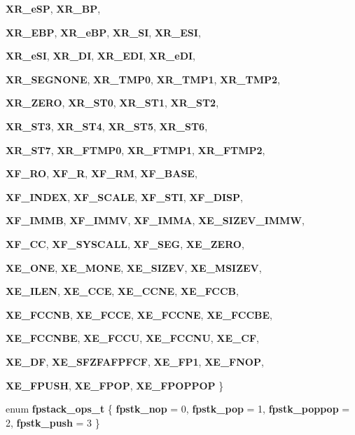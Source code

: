 \begin{CompactItemize}
{\bf XR\_\-eSP}, 
{\bf XR\_\-BP}, 
\par
{\bf XR\_\-EBP}, 
{\bf XR\_\-eBP}, 
{\bf XR\_\-SI}, 
{\bf XR\_\-ESI}, 
\par
{\bf XR\_\-eSI}, 
{\bf XR\_\-DI}, 
{\bf XR\_\-EDI}, 
{\bf XR\_\-eDI}, 
\par
{\bf XR\_\-SEGNONE}, 
{\bf XR\_\-TMP0}, 
{\bf XR\_\-TMP1}, 
{\bf XR\_\-TMP2}, 
\par
{\bf XR\_\-ZERO}, 
{\bf XR\_\-ST0}, 
{\bf XR\_\-ST1}, 
{\bf XR\_\-ST2}, 
\par
{\bf XR\_\-ST3}, 
{\bf XR\_\-ST4}, 
{\bf XR\_\-ST5}, 
{\bf XR\_\-ST6}, 
\par
{\bf XR\_\-ST7}, 
{\bf XR\_\-FTMP0}, 
{\bf XR\_\-FTMP1}, 
{\bf XR\_\-FTMP2}, 
\par
{\bf XF\_\-RO}, 
{\bf XF\_\-R}, 
{\bf XF\_\-RM}, 
{\bf XF\_\-BASE}, 
\par
{\bf XF\_\-INDEX}, 
{\bf XF\_\-SCALE}, 
{\bf XF\_\-STI}, 
{\bf XF\_\-DISP}, 
\par
{\bf XF\_\-IMMB}, 
{\bf XF\_\-IMMV}, 
{\bf XF\_\-IMMA}, 
{\bf XE\_\-SIZEV\_\-IMMW}, 
\par
{\bf XF\_\-CC}, 
{\bf XF\_\-SYSCALL}, 
{\bf XF\_\-SEG}, 
{\bf XE\_\-ZERO}, 
\par
{\bf XE\_\-ONE}, 
{\bf XE\_\-MONE}, 
{\bf XE\_\-SIZEV}, 
{\bf XE\_\-MSIZEV}, 
\par
{\bf XE\_\-ILEN}, 
{\bf XE\_\-CCE}, 
{\bf XE\_\-CCNE}, 
{\bf XE\_\-FCCB}, 
\par
{\bf XE\_\-FCCNB}, 
{\bf XE\_\-FCCE}, 
{\bf XE\_\-FCCNE}, 
{\bf XE\_\-FCCBE}, 
\par
{\bf XE\_\-FCCNBE}, 
{\bf XE\_\-FCCU}, 
{\bf XE\_\-FCCNU}, 
{\bf XE\_\-CF}, 
\par
{\bf XE\_\-DF}, 
{\bf XE\_\-SFZFAFPFCF}, 
{\bf XE\_\-FP1}, 
{\bf XE\_\-FNOP}, 
\par
{\bf XE\_\-FPUSH}, 
{\bf XE\_\-FPOP}, 
{\bf XE\_\-FPOPPOP}
 \}
\item 
enum {\bf fpstack\_\-ops\_\-t} \{ {\bf fpstk\_\-nop} =  0, 
{\bf fpstk\_\-pop} =  1, 
{\bf fpstk\_\-poppop} =  2, 
{\bf fpstk\_\-push} =  3
 \}
\end{CompactItemize}

